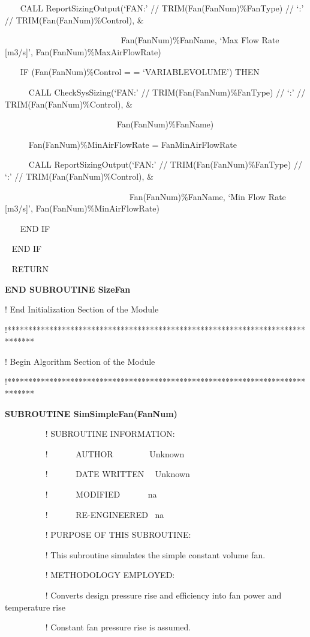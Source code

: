 ~~~ CALL ReportSizingOutput(`FAN:' // TRIM(Fan(FanNum)\%FanType) // `:' // TRIM(Fan(FanNum)\%Control), \&

~~~ ~~~~~~~~~~~~~~~~~~~~~~~~Fan(FanNum)\%FanName, `Max Flow Rate {[}m3/s{]}', Fan(FanNum)\%MaxAirFlowRate)

~~~ IF (Fan(FanNum)\%Control = = `VARIABLEVOLUME') THEN

~~~~~ CALL CheckSysSizing(`FAN:' // TRIM(Fan(FanNum)\%FanType) // `:' // TRIM(Fan(FanNum)\%Control), \&

~~ ~~~~~~~~~~~~~~~~~~~~~~~~Fan(FanNum)\%FanName)

~~~~~ Fan(FanNum)\%MinAirFlowRate = FanMinAirFlowRate

~~~~~ CALL ReportSizingOutput(`FAN:' // TRIM(Fan(FanNum)\%FanType) // `:' // TRIM(Fan(FanNum)\%Control), \&

~~~~~~~~~~~~~~~~~~~~~~~~~~~~~ Fan(FanNum)\%FanName, `Min Flow Rate {[}m3/s{]}', Fan(FanNum)\%MinAirFlowRate)

~~~ END IF

~ END IF

~ RETURN

\textbf{END SUBROUTINE SizeFan}

! End Initialization Section of the Module

!******************************************************************************

! Begin Algorithm Section of the Module

!******************************************************************************

\textbf{SUBROUTINE SimSimpleFan(FanNum)}

~~~~~~~~~ ! SUBROUTINE INFORMATION:

~~~~~~~~~ !~~~~~~ AUTHOR~~~~~~~~ Unknown

~~~~~~~~~ !~~~~~~ DATE WRITTEN~~ Unknown

~~~~~~~~~ !~~~~~~ MODIFIED~~~~~~ na

~~~~~~~~~ !~~~~~~ RE-ENGINEERED~ na

~~~~~~~~~ ! PURPOSE OF THIS SUBROUTINE:

~~~~~~~~~ ! This subroutine simulates the simple constant volume fan.

~~~~~~~~~ ! METHODOLOGY EMPLOYED:

~~~~~~~~~ ! Converts design pressure rise and efficiency into fan power and temperature rise

~~~~~~~~~ ! Constant fan pressure rise is assumed.

